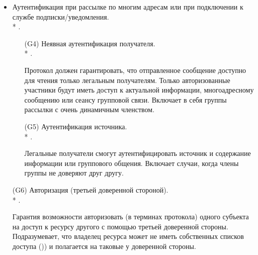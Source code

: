 \begin{itemize}
	\item Аутентификация при рассылке по многим адресам или при подключении к службе подписки/уведомления.\\*
		.
	\begin{itemize}
		\item[(G4)] Неявная аутентификация получателя.\\*
			.
		\item[{}] Протокол должен гарантировать, что отправленное сообщение доступно для чтения только легальным получателям. Только авторизованные участники будут иметь доступ к актуальной информации, многоадресному сообщению или сеансу групповой связи. Включает в себя группы рассылки с очень динамичным членством.
		\item[(G5)] Аутентификация источника.\\*
			.
		\item[{}] Легальные получатели смогут аутентифицировать источник и содержание информации или группового общения. Включает случаи, когда члены группы не доверяют друг другу.
	\end{itemize}

	\item[(G6)] Авторизация (третьей доверенной стороной).\\*
		.
	\item[{}] Гарантия возможности авторизовать (в терминах протокола) одного субъекта на доступ к ресурсу другого с помощью третьей доверенной стороны. Подразумевает, что владелец ресурса может не иметь собственных списков доступа ()) и полагается на таковые у доверенной стороны.


\end{itemize}
